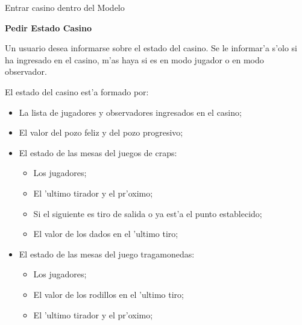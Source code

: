 Entrar casino dentro del Modelo \tam

\clearpage




\clearpage

\textbf{Pedir Estado Casino}

Un usuario desea informarse sobre el estado del casino. Se le informar'a s'olo si ha ingresado en el casino, m'as haya si es en modo jugador o en modo observador.

El estado del casino est'a formado por:

\begin{itemize}
 \item La lista de jugadores y observadores ingresados en el casino;
 \item El valor del pozo feliz y del pozo progresivo;
 \item El estado de las mesas del juegos de craps:
	\begin{itemize}
	 \item Los jugadores;
	 \item El 'ultimo tirador y el pr'oximo;
	 \item Si el siguiente es tiro de salida o ya est'a el punto establecido;
	 \item El valor de los dados en el 'ultimo tiro;
	\end{itemize}
 \item El estado de las mesas del juego tragamonedas:
	\begin{itemize}
 	 \item Los jugadores;
 	 \item El valor de los rodillos en el 'ultimo tiro;
 	 \item El 'ultimo tirador y el pr'oximo;
	\end{itemize}
\end{itemize}
\tam

